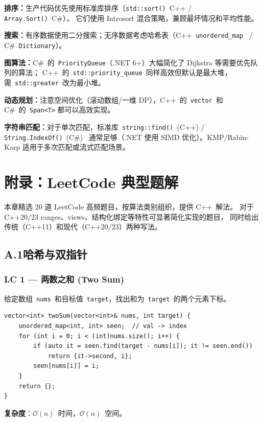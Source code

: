 \documentclass[12pt,a4paper,fontset=fandol]{ctexbook}
\newcommand{\bigO}[1]{\mathcal{O}(#1)}
\newcommand{\Fn}[1]{\texttt{#1()}}
\newcommand{\Tp}[1]{\texttt{#1}}
\begin{document}
\begin{bestpractice}
\textbf{排序：}生产代码优先使用标准库排序（\Fn{std::sort}~C++ / \Fn{Array.Sort}~C\#），
它们使用 Introsort 混合策略，兼顾最坏情况和平均性能。

\textbf{搜索：}有序数据使用二分搜索；无序数据考虑哈希表（C++~\Tp{unordered\_map}~
/ C\#~\Tp{Dictionary}）。

\textbf{图算法：}C\#~的~\Tp{PriorityQueue}（.NET 6+）大幅简化了 Dijkstra 等需要优先队列的算法；
C++~的~\Tp{std::priority\_queue}~同样高效但默认是最大堆，需~\Tp{std::greater}~改为最小堆。

\textbf{动态规划：}注意空间优化（滚动数组/一维 DP），C++~的~\Tp{vector}~和 C\#~的~\texttt{Span<T>}
都可以高效实现。

\textbf{字符串匹配：}对于单次匹配，标准库~\Fn{string::find}~(C++) / \Fn{String.Index\allowbreak{}Of}~(C\#)~
通常足够（.NET 使用 SIMD 优化）。KMP/Rabin-Karp 适用于多次匹配或流式匹配场景。
\end{bestpractice}

\chapter*{附录：LeetCode 典型题解}

本章精选 20 道 LeetCode 高频题目，按算法类别组织，提供 C++~解法。
对于 C++20/23 ranges、views、结构化绑定等特性可显著简化实现的题目，
同时给出传统（C++11）和现代（C++20/23）两种写法。

\section*{A.1\quad 哈希与双指针}

\subsection*{LC 1 — 两数之和 (Two Sum)}

给定数组~\texttt{nums}~和目标值~\texttt{target}，找出和为~\texttt{target}~的两个元素下标。

\begin{lstlisting}[style=cppstyle]
vector<int> twoSum(vector<int>& nums, int target) {
    unordered_map<int, int> seen;  // val -> index
    for (int i = 0; i < (int)nums.size(); i++) {
        if (auto it = seen.find(target - nums[i]); it != seen.end())
            return {it->second, i};
        seen[nums[i]] = i;
    }
    return {};
}
\end{lstlisting}
\textbf{复杂度}：$\bigO{n}$~时间，$\bigO{n}$~空间。
\end{document}
